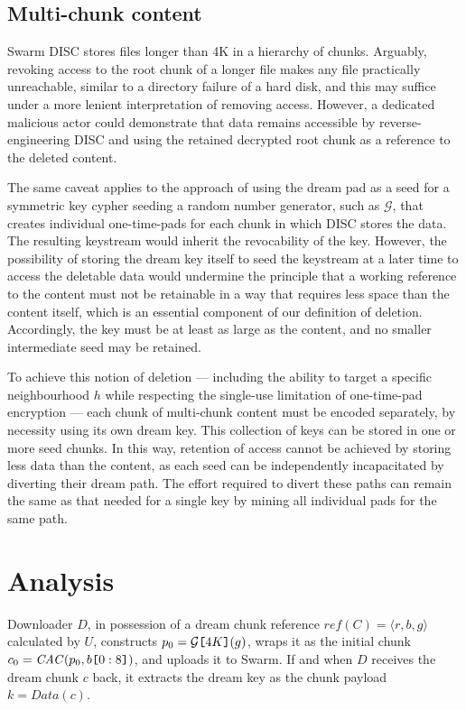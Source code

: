 \documentclass[singlecolumn]{acmart}
\newcommand{\idx}[1]{\texttt{[}\/#1\/\texttt{]}}
\begin{document}
\subsection{Multi-chunk content}

Swarm DISC stores files longer than 4K in a hierarchy of chunks. Arguably, revoking access to the root chunk of a longer file makes any file practically unreachable, similar to a directory failure of a hard disk, and this may suffice under a more lenient interpretation of removing access. However, a dedicated malicious actor could demonstrate that data remains accessible by reverse-engineering DISC and using the retained decrypted root chunk as a reference to the deleted content.

The same caveat applies to the approach of using the dream pad as a seed for a symmetric key cypher seeding a random number generator, such as $\mathcal{G}$, that creates individual one-time-pads for each chunk in which DISC stores the data. The resulting keystream would inherit the revocability of the key. However, the possibility of storing the dream key itself to seed the keystream at a later time to access the deletable data would undermine the principle that a working reference to the content must not be retainable in a way that requires less space than the content itself, which is an essential component of our definition of deletion. Accordingly, the key must be at least as large as the content, and no smaller intermediate seed may be retained.

To achieve this notion of deletion — including the ability to target a specific neighbourhood $h$ while respecting the single-use limitation of one-time-pad encryption — each chunk of multi-chunk content must be encoded separately, by necessity using its own dream key. This collection of keys can be stored in one or more seed chunks. In this way, retention of access cannot be achieved by storing less data than the content, as each seed can be independently incapacitated by diverting their dream path. The effort required to divert these paths can remain the same as that needed for a single key by mining all individual pads for the same path.


\section{Analysis}
\label{sec:analysis}

Downloader $D$, in possession of a dream chunk reference $\mathit{ref}(C)=\langle r,b,g\rangle $ calculated by $U$, constructs $p_0=\mathcal{G}\idx{4K}(g)$, wraps it as the initial chunk $c_0=\mathit{CAC}(p_0,b\idx{0:8})$, and uploads it to Swarm. If and when $D$ receives the dream chunk $c$ back, it extracts the dream key as the chunk payload $k=\mathit{Data}(c)$.
\end{document}
